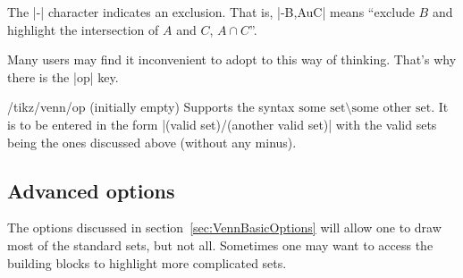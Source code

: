 \documentclass[a4paper]{ltxdoc}
\begin{document}
\begin{codeexample}[width=5cm]
\end{codeexample}

The |-| character indicates an exclusion. That is, |-B,AuC| means ``exclude $B$
and highlight the intersection of $A$ and $C$, $A\cap C$''.

\begin{codeexample}[width=5cm]
\end{codeexample}

Many users may find it inconvenient to adopt to this way of thinking. That's why
there is the |op| key. 

\begin{key}{/tikz/venn/op (initially empty)}
        Supports the syntax $\mbox{some set}\setminus\mbox{some other set}$. It
		is to be entered in the form |(valid set)/(another valid set)| with the
		valid sets being the ones discussed above (without any minus).
\end{key}

\begin{codeexample}[width=5cm]
\end{codeexample}

\begin{codeexample}[width=5cm]
\end{codeexample}


\subsection{Advanced options}
\label{sec:VennAdvancedOptions}

The options discussed in section~\ref{sec:VennBasicOptions} will allow one to
draw most of the standard sets, but not all. Sometimes one may want to access
the building blocks to highlight more complicated sets. 
\end{document}
